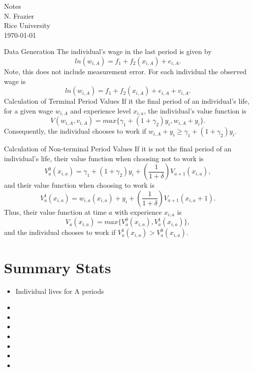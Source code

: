 \documentclass[a4paper,12pt]{article}
\begin{document}
\vspace{-1cm}
{\large \noindent Notes \\    %
\normalsize N. Frazier \vspace{0cm} \\         %
\normalsize Rice University \vspace{.1cm} \\
\today
}
\thispagestyle{empty} %
\singlespace
\normalsize
\hspace{.10in}





Data Generation
The individual's wage in the last period is given by 
        $$ln(w_{i,A}) = f_1 + f_2(x_{i,A}) + e_{i,A}.$$
Note, this does not include measurement error. For each individual the observed wage is
        $$ln(w_{i,A}) = f_1 + f_2(x_{i,A}) + e_{i,A}+v_{i,A}.$$
Calculation of Terminal Period Values
If it the final period of an individual's life, for a given wage $w_{i,A}$ and experience level $x_{i,a}$, the individual's value function is 
    $$V(w_{i,A},v_{i,A}) = max\{\gamma_1 + (1+\gamma_2)y_i,w_{i,A}+y_i\}.$$
Consequently, the individual chooses to work if $w_{i,A}+y_i \geq \gamma_1 + (1+\gamma_2)y_i$.

Calculation of Non-terminal Period Values
If it is not the final period of an individual's life, their value function when choosing not to work is
    $$V_a^0(x_{i,a}) = \gamma_1 + (1+\gamma_2)y_i + \left(\frac{1}{1+\delta}\right)V_{a+1}(x_{i,a}),$$
and their value function when choosing to work is 
    $$V_a^1(x_{i,a}) = w_{i,a}(x_{i,a}) + y_i + \left(\frac{1}{1+\delta}\right)V_{a+1}(x_{i,a}+1).$$
Thus, their value function at time $a$ with experience $x_{i,a}$ is 
    $$V_a(x_{i,a}) = max\{V_a^0(x_{i,a}), V_a^1(x_{i,a})\},$$
and the individual chooses to work if $V_a^1(x_{i,a}) > V_a^0(x_{i,a})$.

\section*{Summary Stats}

\begin{itemize}
	\item Individual lives for A periods
	\item
	\item 
	\item
	\item 
	\item
	\item 
	\item
\end{itemize}
\end{document}
